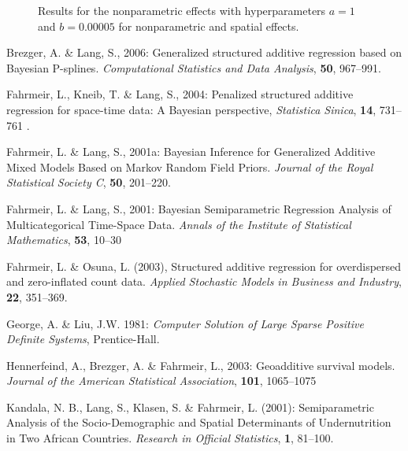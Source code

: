 \documentclass[a4paper]{article}
\begin{document}
\begin{figure}[ht]
\begin{center}
 {\it\caption{Results for
the nonparametric effects with hyperparameters $a=1$ and $b=0.00005$
for nonparametric and spatial effects.\label{sensi3}}}
\end{center}
\end{figure}


\begin{thebibliography}{99}

 Brezger, A. \& Lang,
S., 2006: Generalized structured additive regression based on
Bayesian P-splines. {\it Computational Statistics and Data
Analysis}, {\bf 50}, 967--991.

 Fahrmeir, L., Kneib,
T. \& Lang, S., 2004: Penalized structured additive regression for
space-time data: A Bayesian perspective, {\it Statistica Sinica},
{\bf 14}, 731--761 .

 Fahrmeir, L. \&
Lang, S., 2001a: Bayesian Inference for Generalized Additive Mixed
Models Based on Markov Random Field Priors. {\it Journal of the
Royal Statistical Society C}, {\bf 50}, 201--220.

 Fahrmeir, L. \&
Lang, S., 2001: Bayesian Semiparametric Regression Analysis of
Multicategorical Time-Space Data. {\it Annals of the Institute of
Statistical Mathematics}, {\bf 53}, 10--30

 Fahrmeir, L. \&
Osuna, L. (2003), Structured additive regression for overdispersed and zero-inflated count data.
{\it Applied Stochastic Models in Business and Industry}, {\bf 22}, 351--369.

 George, A. \& Liu,
J.W. 1981: {\it Computer Solution of Large Sparse Positive
Definite Systems}, Prentice-Hall.

 Hennerfeind, A.,
Brezger, A. \& Fahrmeir, L., 2003: Geoadditive survival models.
{\it Journal of the American Statistical Association}, {\bf 101}, 1065--1075

 Kandala, N. B., Lang,
S., Klasen, S. \& Fahrmeir, L. (2001): Semiparametric Analysis of
the Socio-Demographic and Spatial Determinants of Undernutrition
in Two African Countries. {\it Research in Official Statistics},
{\bf 1}, 81--100.


\end{thebibliography}
\end{document}
